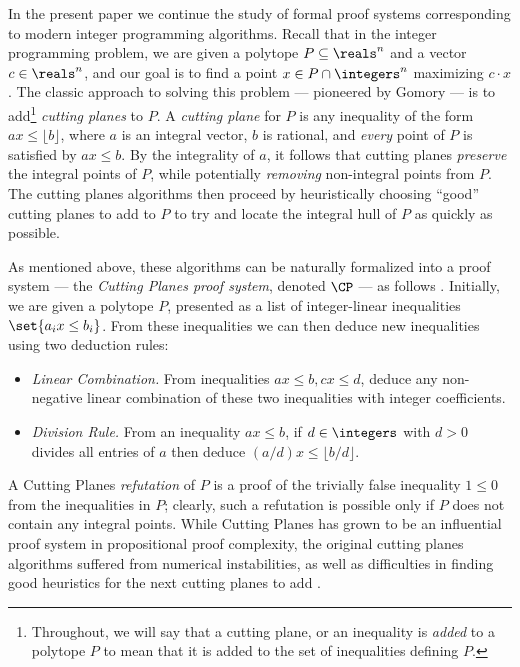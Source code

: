 \documentclass{toc}
\begin{document}
In the present %
paper   %
we continue the study of formal proof systems corresponding to modern integer programming algorithms.
Recall that in the integer programming problem, we are given a polytope $P \subseteq \reals^n$ and a vector $c \in \reals^n$, and our goal is to find a point $x \in P \cap \integers^n$ maximizing $c \cdot x$.
The classic approach to solving this problem --- pioneered by Gomory \cite{gomory1963algorithm} --- is to add\footnote{Throughout, we will say that a cutting plane, or an inequality is \emph{added} to a polytope $P$ to mean that it is added to the set of inequalities defining $P$.} \emph{cutting planes} to  $P$.
A \emph{cutting plane} for $P$ is any inequality of the form $ax \leq \lfloor b \rfloor$, where $a$ is an integral vector, $b$ is rational, and \emph{every} point of $P$ is satisfied by $ax \leq b$.
By the integrality of $a$, it follows that cutting planes \emph{preserve} the integral points of $P$, while potentially \emph{removing} non-integral points from $P$.
The cutting planes algorithms then proceed by heuristically choosing ``good'' cutting planes to add to $P$ to try and locate the integral hull of $P$ as quickly as possible.

As mentioned above, these algorithms can be naturally formalized into a proof system --- the \emph{Cutting Planes proof system}, denoted $\CP$ --- as follows \cite{Chvatal73a}.
Initially, we are given a polytope $P$, presented as a list of integer-linear inequalities $\set{a_i x \leq b_i}$.
From these inequalities we can then deduce new inequalities using two deduction rules:
\begin{itemize}
	\item \emph{Linear Combination.} From inequalities $ax \leq b, cx \leq d$, deduce any non-negative linear combination of these two inequalities with integer coefficients.
	\item \emph{Division Rule.} From an inequality $ax \leq b$, if $d \in \integers$ with $d > 0$ divides all entries of $a$ then deduce $(a/d)x \leq \lfloor b/d \rfloor$.
\end{itemize}
A Cutting Planes \emph{refutation} of $P$ is a proof of the trivially false inequality $1 \leq 0$ from the inequalities in $P$; clearly, such a refutation is possible only if $P$ does not contain any integral points.
While Cutting Planes has grown to be an influential proof system in propositional proof complexity, the original cutting planes algorithms suffered from numerical instabilities, as well as difficulties in finding good heuristics for the next cutting planes to add \cite{gomory1963algorithm}.
\end{document}
